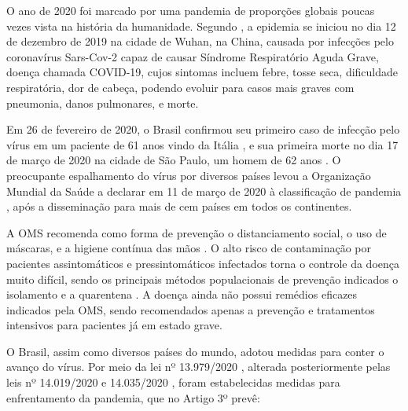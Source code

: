 O ano de 2020 foi marcado por uma pandemia de proporções globais poucas vezes vista na história da humanidade. Segundo , a epidemia se iniciou no dia 12 de dezembro de 2019 na cidade de Wuhan, na China, causada por infecções pelo coronavírus Sars-Cov-2 capaz de causar Síndrome Respiratório Aguda Grave, doença chamada COVID-19, cujos sintomas incluem febre, tosse seca, dificuldade respiratória, dor de cabeça, podendo evoluir para casos mais graves com pneumonia, danos pulmonares, e morte.

Em 26 de fevereiro de 2020, o Brasil confirmou seu primeiro caso de infecção pelo vírus em um paciente de 61 anos vindo da Itália \cite{artigo:folha:primeiro-caso}, e sua primeira morte no dia 17 de março de 2020 na cidade de São Paulo, um homem de 62 anos \cite{artigo:folha:primeira-morte}. O preocupante espalhamento do vírus por diversos países levou a Organização Mundial da Saúde a declarar em 11 de março de 2020 à classificação de pandemia \cite{artigo:folha:oms-declara-pandemia}, após a disseminação para mais de cem países em todos os continentes.

A OMS recomenda como forma de prevenção o distanciamento social, o uso de máscaras, e a higiene contínua das mãos \cite{oms:coronavirus-disease-advice}. O alto risco de contaminação por pacientes assintomáticos e pressintomáticos infectados torna o controle da doença muito difícil, sendo os principais métodos populacionais de prevenção indicados o isolamento e a quarentena \cite{oms:coronavirus-faq}. A doença ainda não possui remédios eficazes indicados pela OMS, sendo recomendados apenas a prevenção e tratamentos intensivos para pacientes já em estado grave.

O Brasil, assim como diversos países do mundo, adotou medidas para conter o avanço do vírus. Por meio da lei nº 13.979/2020 \cite{lei:13979:medidas-para-pandemia}, alterada posteriormente pelas leis nº 14.019/2020 \cite{lei:14019:medidas-para-pandemia} e 14.035/2020 \cite{lei:14035:medidas-para-pandemia}, foram estabelecidas medidas para enfrentamento da pandemia, que no Artigo 3º prevê:

